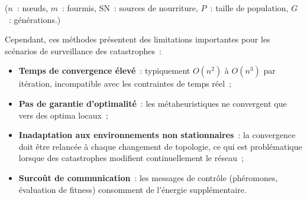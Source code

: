 \begin{table}[htbp]
\centering
\caption{Comparaison des approches métaheuristiques pour le routage dans les WSN.}
\label{tab:metaheuristic-comparison}
\end{table}

\noindent ($n$~: n\oe{}uds, $m$~: fourmis, SN~: sources de nourriture, $P$~: taille de population, $G$~: générations.)

Cependant, ces méthodes présentent des limitations importantes pour les scénarios de surveillance des catastrophes~:
\begin{itemize}
    \item \textbf{Temps de convergence élevé}~: typiquement $O(n^2)$ à $O(n^3)$ par itération, incompatible avec les contraintes de temps réel~;
    \item \textbf{Pas de garantie d'optimalité}~: les métaheuristiques ne convergent que vers des optima locaux~;
    \item \textbf{Inadaptation aux environnements non stationnaires}~: la convergence doit être relancée à chaque changement de topologie, ce qui est problématique lorsque des catastrophes modifient continuellement le réseau~;
    \item \textbf{Surcoût de communication}~: les messages de contrôle (phéromones, évaluation de fitness) consomment de l'énergie supplémentaire.
\end{itemize}

